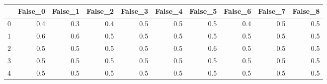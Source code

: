 \begin{tabular}{lrrrrrrrrr}
\toprule
{} &  False\_0 &  False\_1 &  False\_2 &  False\_3 &  False\_4 &  False\_5 &  False\_6 &  False\_7 &  False\_8 \\ \hline
\midrule
0 &      0.4 &      0.3 &      0.4 &      0.5 &      0.5 &      0.5 &      0.4 &      0.5 &      0.5 \\ \hline
1 &      0.6 &      0.6 &      0.5 &      0.5 &      0.5 &      0.5 &      0.5 &      0.5 &      0.5 \\ \hline
2 &      0.5 &      0.5 &      0.5 &      0.5 &      0.5 &      0.6 &      0.5 &      0.5 &      0.5 \\ \hline
3 &      0.5 &      0.5 &      0.5 &      0.5 &      0.5 &      0.5 &      0.5 &      0.5 &      0.5 \\ \hline
4 &      0.5 &      0.5 &      0.5 &      0.5 &      0.5 &      0.5 &      0.5 &      0.5 &      0.5 \\ \hline
\bottomrule
\end{tabular}
